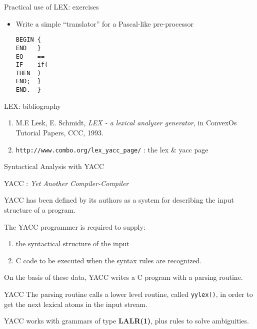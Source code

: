 \begin{frame}[fragile]{Practical use of LEX: exercises}
\begin{itemize}
\item Write a simple ``translator'' for a Pascal-like pre-processor
\begin{verbatim}
BEGIN {
END   }
EQ    ==
IF    if(
THEN  )
END;  }
END.  }
\end{verbatim}
\end{itemize}

\end{frame}
\begin{frame}[fragile]{LEX: bibliography}

\begin{enumerate}
\item \label{lex} M.E Lesk, E. Schmidt, {\em LEX - a lexical  analyzer
generator\/},  in  ConvexOs  Tutorial  Papers,  CCC,  1993.  
\item \verb"http://www.combo.org/lex_yacc_page/" : the lex \& yacc page
\end{enumerate}

\end{frame}
\begin{frame}[fragile]{Syntactical Analysis with YACC}
\begin{center}
YACC : {\em Yet Another Compiler-Compiler\/}
\end{center}
YACC has been defined by its authors as a system for describing
the input structure of a program.


\vspace{20pt}

The YACC programmer is required to supply:
\begin{enumerate}
\item the syntactical structure of the input 
\item C code to be executed when the syntax rules are recognized.
\end{enumerate}


\vspace{20pt}

On the basis of these data, YACC writes a C program with a
parsing routine.


\end{frame}
\begin{frame}[fragile]{YACC}
The parsing routine calls a lower level routine, called {\tt yylex()},
in order to get the next lexical atoms in the input stream.


\vspace{20pt}

YACC works with grammars of type
{\bf LALR(1)}, plus rules to solve ambiguities.


\end{frame}

